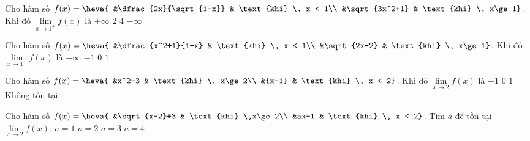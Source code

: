\begin{ex}%
		Cho hàm số $f(x)=\heva{
			&\dfrac{2x}{\sqrt{1-x}} & \text{khi} \,  x < 1\\
			&\sqrt{3x^2+1} & \text{khi} \,  x\ge 1}$. Khi đó  $\lim\limits_{x\to{1^+}}f(x)$ là
	\choice
		{$+\infty$}
		{\True $2$}
		{$4$}
		{$-\infty$}
\end{ex}

\begin{ex}%
		Cho hàm số $f(x)=\heva{
			&\dfrac{x^2+1}{1-x} & \text{khi} \, x < 1\\
			&\sqrt{2x-2}  & \text{khi} \, x\ge 1}$. Khi đó  $\lim\limits_{x\to{1^-}}f(x)$ là
	\choice
		{\True $+\infty $}
		{$-1$}
		{$0$}
		{$1$}
\end{ex}

\begin{ex}%
		Cho hàm số $f(x)=\heva{
				&x^2-3 & \text{khi} \, x\ge 2\\
				&{x-1} & \text{khi} \, x < 2}$. Khi đó $\lim\limits_{x\to 2}f(x)$ là
	\choice
		{$-1$}
		{$0$}
		{\True $1$}
		{Không tồn tại}
\end{ex}

\begin{ex}%
		Cho hàm số $f(x)=\heva{
			&\sqrt{x-2}+3 & \text{khi} \,x\ge 2\\
			&ax-1 & \text{khi} \, x < 2}$. Tìm $a$ để tồn tại $\lim\limits_{x\to 2}f(x)$.
	\choice
		{$a=1$}
		{\True $a=2$}
		{$a=3$}
		{$a=4$}
\end{ex}

